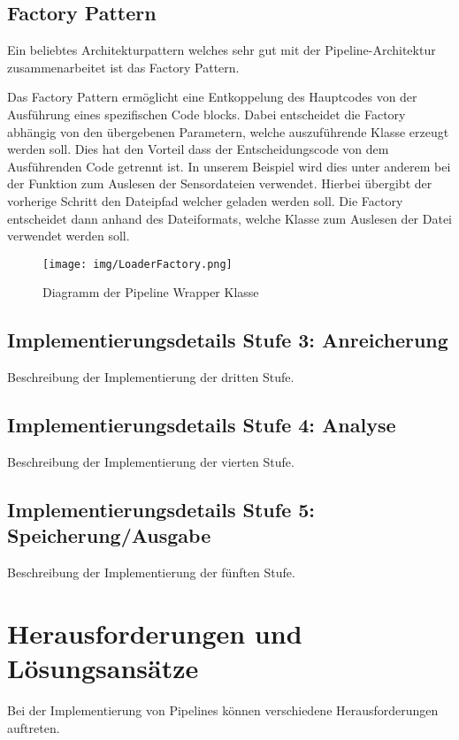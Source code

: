 \documentclass[a4paper]{article} %
\begin{document}
\subsection{Factory Pattern}
Ein beliebtes Architekturpattern welches sehr gut mit der Pipeline-Architektur zusammenarbeitet ist das Factory Pattern.

Das Factory Pattern ermöglicht eine Entkoppelung des Hauptcodes von der Ausführung eines spezifischen Code blocks. Dabei entscheidet die Factory abhängig von den übergebenen Parametern, welche auszuführende Klasse erzeugt werden soll. Dies hat den Vorteil dass der Entscheidungscode von dem Ausführenden Code getrennt ist. In unserem Beispiel wird dies unter anderem bei der Funktion zum Auslesen der Sensordateien verwendet. Hierbei übergibt der vorherige Schritt den Dateipfad welcher geladen werden soll. Die Factory entscheidet dann anhand des Dateiformats, welche Klasse zum Auslesen der Datei verwendet werden soll.

\begin{figure}[htbp] %
    \centering %
    \texttt{[image: img/LoaderFactory.png]} %
    \caption{Diagramm der Pipeline Wrapper Klasse} %
    \label{fig:loaderFactory} %
\end{figure}

\subsection{Implementierungsdetails Stufe 3: Anreicherung}
Beschreibung der Implementierung der dritten Stufe.
\blindtext[2]
\lipsum[13-14]

\subsection{Implementierungsdetails Stufe 4: Analyse}
Beschreibung der Implementierung der vierten Stufe.
\blindtext[2]
\lipsum[15-16]

\subsection{Implementierungsdetails Stufe 5: Speicherung/Ausgabe}
Beschreibung der Implementierung der fünften Stufe.
\blindtext[2]
\lipsum[17-18]


\section{Herausforderungen und Lösungsansätze}
Bei der Implementierung von Pipelines können verschiedene Herausforderungen auftreten.
\end{document}
